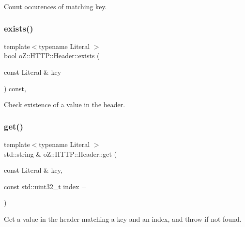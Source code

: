 Count occurences of matching key. 

\mbox{\label{classo_z_1_1_h_t_t_p_1_1_header_aac91315b9984871e672845f8a69cf1ef}} 
\subsubsection{\texorpdfstring{exists()}{exists()}}
{\footnotesize\ttfamily template$<$typename Literal $>$ \\
bool o\+Z\+::\+H\+T\+T\+P\+::\+Header\+::exists (\begin{DoxyParamCaption}\item[{const Literal \&}]{key }\end{DoxyParamCaption}) const\hspace{0.3cm}{\ttfamily [inline]}, {\ttfamily [noexcept]}}



Check existence of a value in the header. 

\mbox{\label{classo_z_1_1_h_t_t_p_1_1_header_ad09c489218fdd63493dd5ce7b025265e}} 
\subsubsection{\texorpdfstring{get()}{get()}\hspace{0.1cm}{\footnotesize\ttfamily [1/2]}}
{\footnotesize\ttfamily template$<$typename Literal $>$ \\
std\+::string \& o\+Z\+::\+H\+T\+T\+P\+::\+Header\+::get (\begin{DoxyParamCaption}\item[{const Literal \&}]{key,  }\item[{const std\+::uint32\+\_\+t}]{index = {} }\end{DoxyParamCaption})}



Get a value in the header matching a key and an index, and throw if not found. 

\mbox{\label{classo_z_1_1_h_t_t_p_1_1_header_abad6705f4eff158eec13825b3419d265}} 
